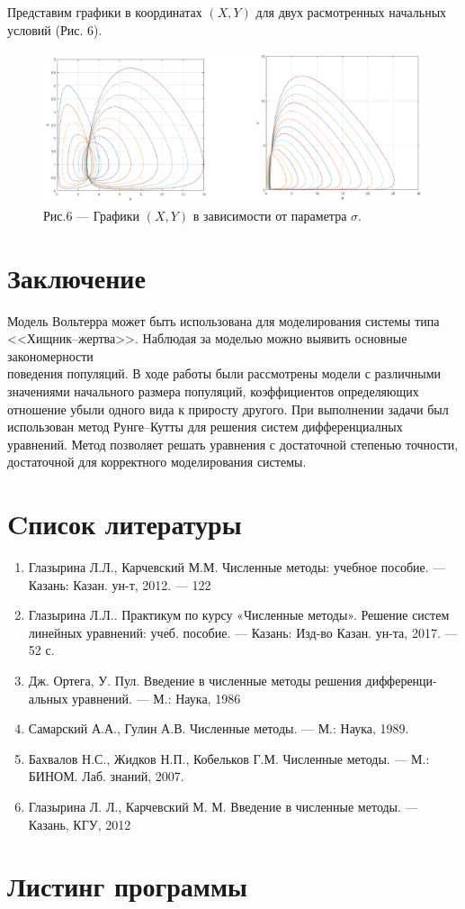 \documentclass[a4paper,12pt]{article}
\begin{document}
Представим графики в координатах $(X, Y)$ для двух расмотренных начальных условий (Рис. 6).
\begin{figure}[h]
    \centering
    \includegraphics[width=1\linewidth]{pictures/task4.png}
    \captionsetup{labelformat=empty}
    \caption{Рис.6 --- Графики $(X, Y)$ в зависимости от параметра $\sigma$.}
\end{figure}

\newpage
\section{Заключение}
\hspace{0.5cm} Модель Вольтерра может быть использована для моделирования системы типа \\
<<Хищник--жертва>>. Наблюдая за моделью можно выявить основные закономерности \\
поведения популяций. В ходе работы были рассмотрены
модели с различными значениями начального размера популяций, коэффициентов определяющих отношение убыли 
одного вида к приросту другого. При выполнении задачи был использован метод Рунге--Кутты для решения систем 
дифференциалных уравнений. Метод позволяет решать уравнения с достаточной степенью точности, достаточной для 
корректного моделирования системы.
\newpage
\section{Cписок литературы}
\begin{enumerate}
    \item Глазырина Л.Л., Карчевский М.М. Численные методы: учебное пособие. — Казань: Казан.
    ун-т, 2012. — 122 
    \item Глазырина Л.Л.. Практикум по курсу «Численные методы». Решение
    систем линейных уравнений: учеб. пособие. — Казань: Изд-во Казан. ун-та, 2017. — 52 с.
    \item Дж. Ортега, У. Пул. Введение в численные методы решения дифференци-
    альных уравнений. — М.: Наука, 1986
    \item Самарский А.А., Гулин А.В. Численные методы. — М.: Наука, 1989.
    \item Бахвалов Н.С., Жидков Н.П., Кобельков Г.М. Численные методы. — М.:
    БИНОМ. Лаб. знаний, 2007.
    \item Глазырина Л. Л., Карчевский М. М. Введение в численные методы. —
    Казань, КГУ, 2012
\end{enumerate}
\newpage

\section{Листинг программы}

\end{document}
